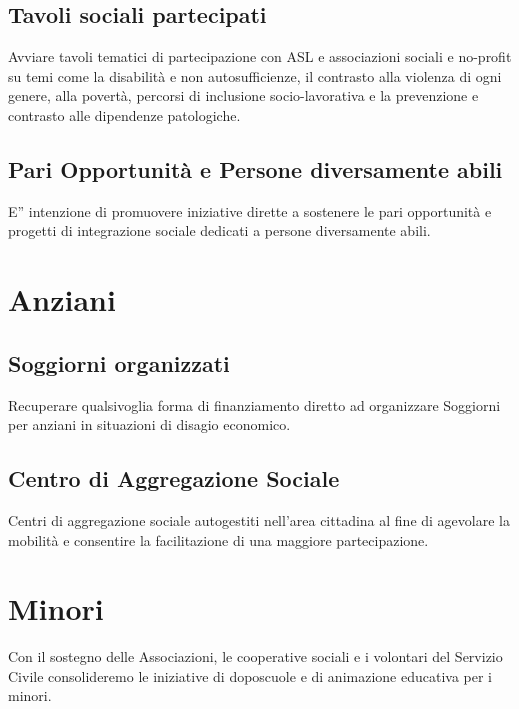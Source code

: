 \documentclass[a4paper,14pt,italian]{sphinxmanual}
\begin{document}
\subsection{Tavoli sociali partecipati}
\label{\detokenize{salute:tavoli-sociali-partecipati}}
Avviare tavoli tematici di partecipazione con ASL e associazioni sociali e no-profit su temi come la disabilità e non autosufficienze, il contrasto alla violenza di ogni genere, alla povertà, percorsi di inclusione socio-lavorativa e la prevenzione e contrasto alle dipendenze patologiche.


\subsection{Pari Opportunità e Persone diversamente abili}
\label{\detokenize{salute:pari-opportunita-e-persone-diversamente-abili}}
E” intenzione di promuovere iniziative dirette a sostenere le pari opportunità e progetti di integrazione sociale dedicati a persone diversamente abili.


\section{Anziani}
\label{\detokenize{salute:anziani}}


\subsection{Soggiorni organizzati}
\label{\detokenize{salute:soggiorni-organizzati}}
Recuperare qualsivoglia forma di finanziamento diretto ad organizzare Soggiorni per anziani in situazioni di disagio economico.


\subsection{Centro di Aggregazione Sociale}
\label{\detokenize{salute:centro-di-aggregazione-sociale}}
Centri di aggregazione sociale autogestiti nell’area cittadina al fine di agevolare la mobilità e consentire la facilitazione di una maggiore partecipazione.


\section{Minori}
\label{\detokenize{salute:minori}}
Con il sostegno delle Associazioni, le cooperative sociali e i volontari del Servizio Civile consolideremo le iniziative di doposcuole e di animazione educativa per i minori.
\end{document}
